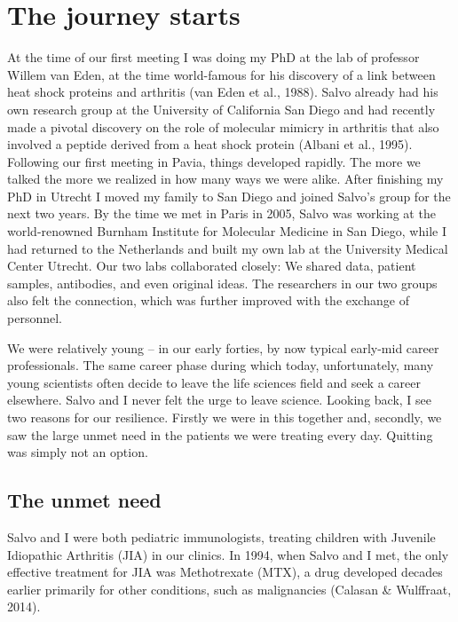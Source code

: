 \documentclass[authordate, editorial]{jote-new-article}
\begin{document}
	\section{The journey starts}



	At the time of our first meeting I was doing my PhD at the lab of professor Willem van Eden, at the time world-famous for his discovery of a link between heat shock proteins and arthritis (van Eden et al., 1988). Salvo already had his own research group at the University of California San Diego and had recently made a pivotal discovery on the role of molecular mimicry in arthritis that also involved a peptide derived from a heat shock protein (Albani et al., 1995). Following our first meeting in Pavia, things developed rapidly. The more we talked the more we realized in how many ways we were alike. After finishing my PhD in Utrecht I moved my family to San Diego and joined Salvo's group for the next two years. By the time we met in Paris in 2005, Salvo was working at the world-renowned Burnham Institute for Molecular Medicine in San Diego, while I had returned to the Netherlands and built my own lab at the University Medical Center Utrecht. Our two labs collaborated closely: We shared data, patient samples, antibodies, and even original ideas. The researchers in our two groups also felt the connection, which was further improved with the exchange of personnel.







	We were relatively young -- in our early forties, by now typical early-mid career professionals. The same career phase during which today, unfortunately, many young scientists often decide to leave the life sciences field and seek a career elsewhere. Salvo and I never felt the urge to leave science. Looking back, I see two reasons for our resilience. Firstly we were in this together and, secondly, we saw the large unmet need in the patients we were treating every day. Quitting was simply not an option.







	\subsection{The unmet need}



	Salvo and I were both pediatric immunologists, treating children with Juvenile Idiopathic Arthritis (JIA) in our clinics. In 1994, when Salvo and I met, the only effective treatment for JIA was Methotrexate (MTX), a drug developed decades earlier primarily for other conditions, such as malignancies (Calasan \& Wulffraat, 2014).
\end{document}
